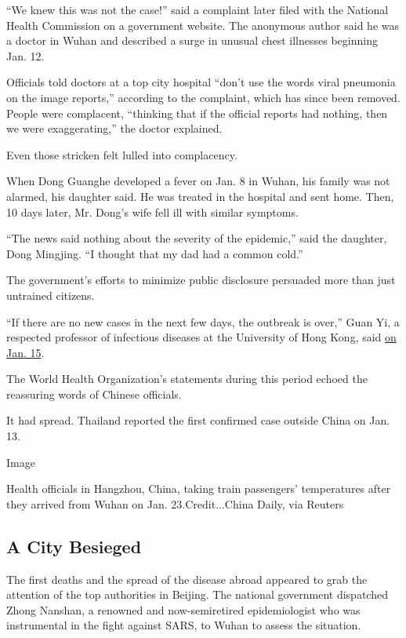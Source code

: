 ``We knew this was not the case!'' said a complaint later filed with the
National Health Commission on a government website. The anonymous author
said he was a doctor in Wuhan and described a surge in unusual chest
illnesses beginning Jan. 12.

Officials told doctors at a top city hospital ``don't use the words
viral pneumonia on the image reports,'' according to the complaint,
which has since been removed. People were complacent, ``thinking that if
the official reports had nothing, then we were exaggerating,'' the
doctor explained.

Even those stricken felt lulled into complacency.

When Dong Guanghe developed a fever on Jan. 8 in Wuhan, his family was
not alarmed, his daughter said. He was treated in the hospital and sent
home. Then, 10 days later, Mr. Dong's wife fell ill with similar
symptoms.

``The news said nothing about the severity of the epidemic,'' said the
daughter, Dong Mingjing. ``I thought that my dad had a common cold.''

The government's efforts to minimize public disclosure persuaded more
than just untrained citizens.

``If there are no new cases in the next few days, the outbreak is
over,'' Guan Yi, a respected professor of infectious diseases at the
University of Hong Kong, said
\href{https://www.nytimes3xbfgragh.onion/2020/01/15/world/asia/coronavirus-japan-china.html}{on
Jan. 15}.

The World Health Organization's statements during this period echoed the
reassuring words of Chinese officials.

It had spread. Thailand reported the first confirmed case outside China
on Jan. 13.

Image

Health officials in Hangzhou, China, taking train passengers'
temperatures after they arrived from Wuhan on Jan. 23.Credit...China
Daily, via Reuters

\hypertarget{a-city-besieged}{%
\subsection{A City Besieged}\label{a-city-besieged}}

The first deaths and the spread of the disease abroad appeared to grab
the attention of the top authorities in Beijing. The national government
dispatched Zhong Nanshan, a renowned and now-semiretired epidemiologist
who was instrumental in the fight against SARS, to Wuhan to assess the
situation.

